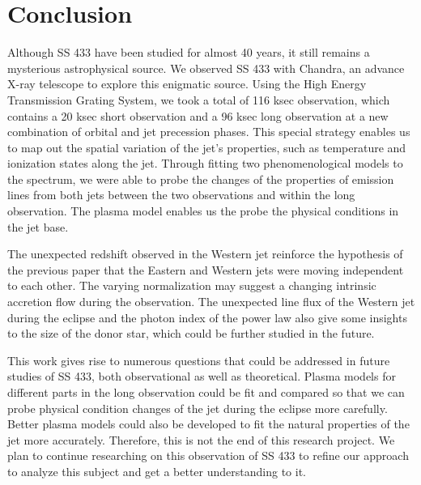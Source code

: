\chapter{Conclusion}
Although SS 433 have been studied for almost 40 years, it still remains a mysterious astrophysical source.
We observed SS 433 with Chandra, an advance X-ray telescope to explore this enigmatic source. Using the High Energy Transmission Grating System, we took a total of 116 ksec observation, which contains a 20 ksec short observation and a 96 ksec long observation at a new combination of orbital and jet precession phases. This special strategy enables us to map out the spatial variation of the jet's properties, such as temperature and ionization states along the jet. Through fitting two phenomenological models to the spectrum, we were able to probe the changes of the properties of emission lines from both jets between the two observations and within the long observation. The plasma model enables us the probe the physical conditions in the jet base.\par 

The unexpected redshift observed in the Western jet reinforce the hypothesis of the previous paper that the Eastern and Western jets were moving independent to each other. The varying normalization may suggest a changing intrinsic accretion flow during the observation. The unexpected line flux of the Western jet during the eclipse and the photon index of the power law also give some insights to the size of the donor star, which could be further studied in the future. \par 
This work gives rise to numerous questions that could be addressed in future studies of SS 433, both observational as well as theoretical. Plasma models for different parts in the long observation could be fit and compared so that we can probe physical condition changes of the jet during the eclipse more carefully. Better plasma models could also be developed to fit the natural properties of the jet more accurately. Therefore, this is not the end of this research project. We plan to continue researching on this observation of SS 433 to refine our approach to analyze this subject and get a better understanding to it.